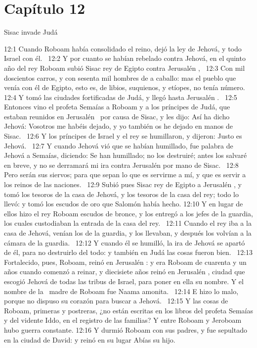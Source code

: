 											\section*{Capítulo 12}
												Sisac invade Judá  
												
												
												12:1 Cuando Roboam había consolidado el reino, dejó la ley de Jehová, y todo Israel con él.  
												12:2 Y por cuanto se habían rebelado contra Jehová, en el quinto año del rey Roboam subió Sisac rey de Egipto contra Jerusalén ,  
												12:3 Con mil doscientos carros, y con sesenta mil hombres de a caballo: mas el pueblo que venía con él de Egipto, esto es, de libios, suquienos, y etíopes, no tenía número.  
												12:4 Y tomó las ciudades fortificadas de Judá, y llegó hasta Jerusalén .  
												12:5 Entonces vino el profeta Semaías a Roboam y a los príncipes de Judá, que estaban reunidos en Jerusalén  por causa de Sisac, y les dijo: Así ha dicho Jehová: Vosotros me habéis dejado, y yo también os he dejado en manos de Sisac.  
												12:6 Y los príncipes de Israel y el rey se humillaron, y dijeron: Justo es Jehová.  
												12:7 Y cuando Jehová vió que se habían humillado, fue palabra de Jehová a Semaías, diciendo: Se han humillado; no los destruiré; antes los salvaré en breve, y no se derramará mi ira contra Jerusalén por mano de Sisac.  
												12:8 Pero serán sus siervos; para que sepan lo que es servirme a mí, y que es servir a los reinos de las naciones.  
												12:9 Subió pues Sisac rey de Egipto a Jerusalén , y tomó los tesoros de la casa de Jehová, y los tesoros de la casa del rey; todo lo llevó: y tomó los escudos de oro que Salomón había hecho. 
												12:10 Y en lugar de ellos hizo el rey Roboam escudos de bronce, y los entregó a los jefes de la guardia, los cuales custodiaban la entrada de la casa del rey.  
												12:11 Cuando el rey iba a la casa de Jehová, venían los de la guardia, y los llevaban, y después los volvían a la cámara de la guardia.  
												12:12 Y cuando él se humilló, la ira de Jehová se apartó de él, para no destruirlo del todo: y también en Judá las cosas fueron bien.  
												12:13 Fortalecido, pues, Roboam, reinó en Jerusalén : y era Roboam de cuarenta y un años cuando comenzó a reinar, y diecisiete años reinó en Jerusalén , ciudad que escogió Jehová de todas las tribus de Israel, para poner en ella su nombre. Y el nombre de la  madre de Roboam fue Naama amonita.  
												12:14 E hizo lo malo, porque no dispuso su corazón para buscar a Jehová.  
												12:15 Y las cosas de Roboam, primeras y postreras, ¿no están escritas en los libros del profeta Semaías y del vidente Iddo, en el registro de las familias? Y entre Roboam y Jeroboam hubo guerra constante. 
												12:16 Y durmió Roboam con sus padres, y fue sepultado en la ciudad de David: y reinó en su lugar Abías su hijo.  
